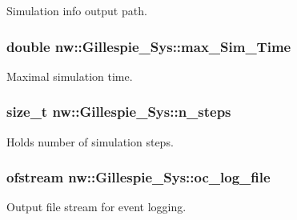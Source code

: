 Simulation info output path. 

\hypertarget{classnw_1_1_gillespie___sys_a232687e1809761fea124e81aa7273f3c}{
\subsubsection[{max\+\_\+\+Sim\+\_\+\+Time}]{\setlength{\rightskip}{0pt plus 5cm}double nw\+::\+Gillespie\+\_\+\+Sys\+::max\+\_\+\+Sim\+\_\+\+Time\hspace{0.3cm}{\ttfamily [private]}}}\label{classnw_1_1_gillespie___sys_a232687e1809761fea124e81aa7273f3c}


Maximal simulation time. 

\hypertarget{classnw_1_1_gillespie___sys_a56184d8a2afdebca9cfe6e08e191fe51}{
\subsubsection[{n\+\_\+steps}]{\setlength{\rightskip}{0pt plus 5cm}size\+\_\+t nw\+::\+Gillespie\+\_\+\+Sys\+::n\+\_\+steps\hspace{0.3cm}{\ttfamily [private]}}}\label{classnw_1_1_gillespie___sys_a56184d8a2afdebca9cfe6e08e191fe51}


Holds number of simulation steps. 

\hypertarget{classnw_1_1_gillespie___sys_a4209e0d87ac2e0c5b9cad1074a900c80}{
\subsubsection[{oc\+\_\+log\+\_\+file}]{\setlength{\rightskip}{0pt plus 5cm}ofstream nw\+::\+Gillespie\+\_\+\+Sys\+::oc\+\_\+log\+\_\+file\hspace{0.3cm}{\ttfamily [private]}}}\label{classnw_1_1_gillespie___sys_a4209e0d87ac2e0c5b9cad1074a900c80}


Output file stream for event logging. 

